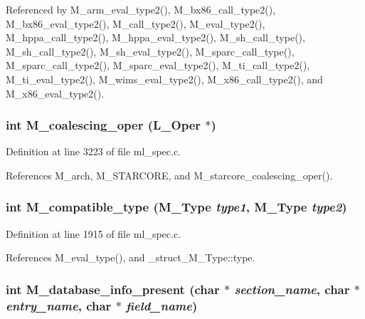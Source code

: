 Referenced by M\_\-arm\_\-eval\_\-type2(), M\_\-bx86\_\-call\_\-type2(), M\_\-bx86\_\-eval\_\-type2(), M\_\-call\_\-type2(), M\_\-eval\_\-type2(), M\_\-hppa\_\-call\_\-type2(), M\_\-hppa\_\-eval\_\-type2(), M\_\-sh\_\-call\_\-type(), M\_\-sh\_\-call\_\-type2(), M\_\-sh\_\-eval\_\-type2(), M\_\-sparc\_\-call\_\-type(), M\_\-sparc\_\-call\_\-type2(), M\_\-sparc\_\-eval\_\-type2(), M\_\-ti\_\-call\_\-type2(), M\_\-ti\_\-eval\_\-type2(), M\_\-wims\_\-eval\_\-type2(), M\_\-x86\_\-call\_\-type2(), and M\_\-x86\_\-eval\_\-type2().
\subsubsection{\setlength{\rightskip}{0pt plus 5cm}int M\_\-coalescing\_\-oper (L\_\-Oper $\ast$)}\label{m__spec_8h_b2fe1c70f8a659b23e8c3d790423986d}




Definition at line 3223 of file ml\_\-spec.c.

References M\_\-arch, M\_\-STARCORE, and M\_\-starcore\_\-coalescing\_\-oper().
\subsubsection{\setlength{\rightskip}{0pt plus 5cm}int M\_\-compatible\_\-type (\bf{M\_\-Type} {\em type1}, \bf{M\_\-Type} {\em type2})}\label{m__spec_8h_3090229b6d25eec2f18603c3ba0f6ba4}




Definition at line 1915 of file ml\_\-spec.c.

References M\_\-eval\_\-type(), and \_\-struct\_\-M\_\-Type::type.
\subsubsection{\setlength{\rightskip}{0pt plus 5cm}int M\_\-database\_\-info\_\-present (char $\ast$ {\em section\_\-name}, char $\ast$ {\em entry\_\-name}, char $\ast$ {\em field\_\-name})}\label{m__spec_8h_3aef7fd2d4a98ba53736eda03b55a7a1}




